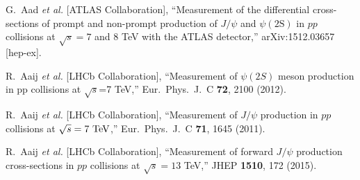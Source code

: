 \documentclass[aps,prc,preprint,superscriptaddress,showpacs,showkeys,amsmath]{revtex4-1}
\begin{document}
\begin{thebibliography}{100}
  G.~Aad {\it et al.} [ATLAS Collaboration],
  ``Measurement of the differential cross-sections of prompt and non-prompt production of $J/\psi$ 
  and $\psi(2\mathrm{S})$ in $pp$ collisions at $\sqrt{s} = 7$ and $8$ TeV with the ATLAS detector,''
  arXiv:1512.03657 [hep-ex].




  R.~Aaij {\it et al.} [LHCb Collaboration],
  ``Measurement of $\psi(2S)$ meson production in pp collisions at $\sqrt{s}$=7 TeV,''
  Eur.\ Phys.\ J.\ C {\bf 72}, 2100 (2012).


  R.~Aaij {\it et al.} [LHCb Collaboration],
  ``Measurement of $J/\psi$ production in $pp$ collisions at $\sqrt{s}=7~\rm{TeV}$,''
  Eur.\ Phys.\ J.\ C {\bf 71}, 1645 (2011).

  R.~Aaij {\it et al.} [LHCb Collaboration],
  ``Measurement of forward $J/\psi$ production cross-sections in $pp$ collisions at $\sqrt{s}=13$ TeV,''
  JHEP {\bf 1510}, 172 (2015).




 










\end{thebibliography}
\end{document}
